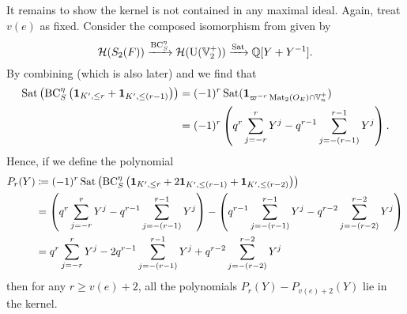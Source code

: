 It remains to show the kernel is not contained in any maximal ideal.
Again, treat $v(e)$ as fixed.
Consider the composed isomorphism from 
given by
\[ \mathcal H(S_2(F)) \xrightarrow{\operatorname{BC}^\eta_S} \mathcal H(\operatorname{U}(\mathbb V_2^+)) \xrightarrow{\operatorname{Sat}} \mathbb Q[Y + Y^{-1}]. \]
By combining \cite[Equation (7.1.9)]{ref:AFLspherical}
(which is also  later)
and \cite[Equation (7.1.4)]{ref:AFLspherical}
we find that
\begin{align*}
  \operatorname{Sat}\left(\operatorname{BC}^\eta_S\left(\mathbf{1}_{K', \le r} + \mathbf{1}_{K', \le (r-1)}\right)\right)
  &= (-1)^r \operatorname{Sat}(\mathbf{1}_{\varpi^{-r} \operatorname{Mat}_2(O_E) \cap \mathbb V_n^+}) \\
  &= (-1)^r \left( q^r \sum_{j=-r}^r Y^j - q^{r-1} \sum_{j=-(r-1)}^{r-1} Y^j \right).
\end{align*}
Hence, if we define the polynomial
\begin{align*}
  P_r(Y) &\coloneqq (-1)^r \operatorname{Sat}\left(\operatorname{BC}^\eta_S\left(
    \mathbf{1}_{K', \le r} + 2\mathbf{1}_{K', \le (r-1)}
    + \mathbf{1}_{K', \le (r-2)} \right)\right) \\
  &= \left( q^r \sum_{j=-r}^r Y^j - q^{r-1} \sum_{j=-(r-1)}^{r-1} Y^j \right)
    - \left( q^{r-1} \sum_{j=-(r-1)}^{r-1} Y^j - q^{r-2} \sum_{j=-(r-2)}^{r-2} Y^j \right) \\
  &= q^r \sum_{j=-r}^r Y^j - 2q^{r-1} \sum_{j=-(r-1)}^{r-1} Y^j + q^{r-2} \sum_{j=-(r-2)}^{r-2} Y^j
\end{align*}
then for any $r \ge v(e)+2$,
all the polynomials $P_r(Y) - P_{v(e)+2}(Y)$ lie in the kernel.

